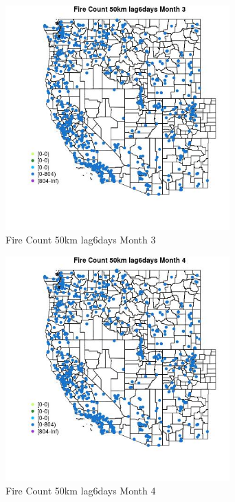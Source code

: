 \begin{figure} 
\centering  
\includegraphics[width=0.77\textwidth]{Code_Outputs/Report_ML_input_PM25_Step4_part_f_de_duplicated_aveswNAs_MapObsMo3Fire_Count_50km_lag6days.jpg} 
\caption{\label{fig:Report_ML_input_PM25_Step4_part_f_de_duplicated_aveswNAsMapObsMo3Fire_Count_50km_lag6days}Fire Count 50km lag6days Month 3} 
\end{figure} 
 

\begin{figure} 
\centering  
\includegraphics[width=0.77\textwidth]{Code_Outputs/Report_ML_input_PM25_Step4_part_f_de_duplicated_aveswNAs_MapObsMo4Fire_Count_50km_lag6days.jpg} 
\caption{\label{fig:Report_ML_input_PM25_Step4_part_f_de_duplicated_aveswNAsMapObsMo4Fire_Count_50km_lag6days}Fire Count 50km lag6days Month 4} 
\end{figure} 
 

